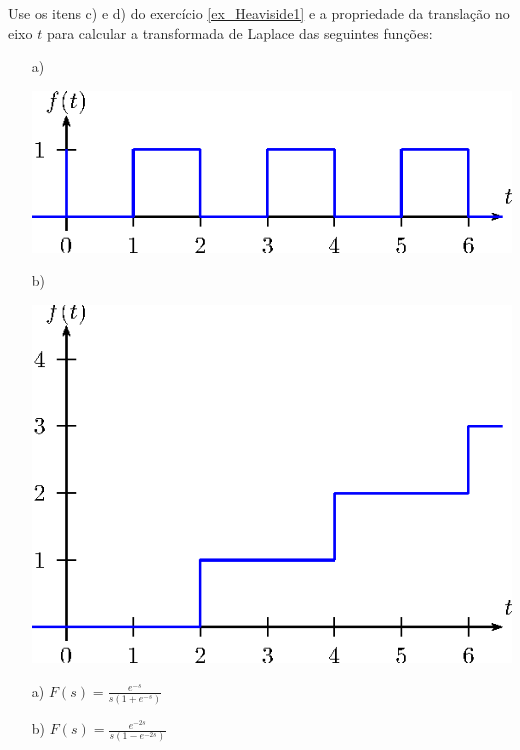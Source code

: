 \begin{exer} Use os itens c) e d) do exercício \ref{ex_Heaviside1} e a propriedade da translação no eixo $t$ para calcular a transformada de Laplace das seguintes funções:
\begin{itemize}
\item[a)]~
\begin{center}

\includegraphics{cap_trans_int/pics/figura_24}\end{center}
\item[b)]~
\begin{center}

\includegraphics{cap_trans_int/pics/figura_25}\end{center}
\end{itemize}
\end{exer}
\begin{resp}
 \begin{itemize}
        \item[a)] $\displaystyle F(s)=\frac{e^{-s}}{s(1+e^{-s})}$
        \item[b)] $\displaystyle F(s)=\frac{e^{-2s}}{s(1-e^{-2s})}$ 
 \end{itemize}
\end{resp}

